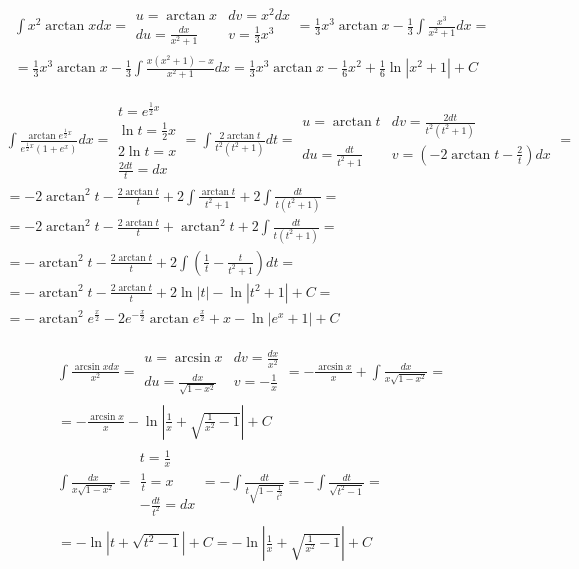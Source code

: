 
\begin{gather*}\int x^2\arctan x dx = \begin{array}{|ll|}
u=\arctan x & dv=x^2dx \\
du=\frac{dx}{x^2+1} & v=\frac{1}{3}x^3 \end{array} = \frac{1}{3}x^3\arctan x-\frac{1}{3}\int \frac{x^3}{x^2+1}dx =  \\
= \frac{1}{3}x^3\arctan x-\frac{1}{3}\int \frac{x(x^2+1)-x}{x^2+1}dx = \frac{1}{3}x^3\arctan x-\frac{1}{6}x^2+\frac{1}{6}\ln|x^2+1|+C\end{gather*}



\begin{gather*}\int \frac{\arctan e^{\frac{1}{2}x}}{e^{\frac{1}{2}x}(1+e^x)}dx = \begin{array}{|l|}
t=e^{\frac{1}{2}x} \\
\ln t = \frac{1}{2}x \\
2\ln t = x \\
\frac{2dt}{t} = dx \end{array} = \int \frac{2\arctan t}{t^2(t^2+1)}dt = \begin{array}{|ll|}
u=\arctan t & dv=\frac{2dt}{t^2(t^2+1)} \\
du=\frac{dt}{t^2+1} & v=\left(-2\arctan t-\frac{2}{t}\right)dx
\end{array} =  \\
= -2\arctan^2t-\frac{2\arctan t}{t}+2\int \frac{\arctan t}{t^2+1}+2\int \frac{dt}{t(t^2+1)} =  \\
= -2\arctan^2t-\frac{2\arctan t}{t}+\arctan^2 t+2\int \frac{dt}{t(t^2+1)} =  \\
= -\arctan^2t-\frac{2\arctan t}{t}+2\int \left(\frac{1}{t}-\frac{t}{t^2+1}\right)dt =  \\
= -\arctan^2t-\frac{2\arctan t}{t}+2\ln|t|-\ln|t^2+1|+C =  \\
= -\arctan^2e^{\frac{x}{2}}-2e^{-\frac{x}{2}}\arctan e^{\frac{x}{2}}+x-\ln|e^x+1|+C\end{gather*}



\begin{gather*}\int \frac{\arcsin x dx}{x^2} = \begin{array}{|ll|}
u=\arcsin x & dv=\frac{dx}{x^2} \\
du=\frac{dx}{\sqrt{1-x^2}} & v=-\frac{1}{x}
\end{array} = -\frac{\arcsin x}{x} + \int \frac{dx}{x\sqrt{1-x^2}} =  \\
= -\frac{\arcsin x}{x} -\ln\left|\frac{1}{x}+\sqrt{\frac{1}{x^2}-1}\right|+C \\
\int \frac{dx}{x\sqrt{1-x^2}} = \begin{array}{|l|}
t=\frac{1}{x} \\ \frac{1}{t}=x \\ -\frac{dt}{t^2}=dx
\end{array} = -\int \frac{dt}{t\sqrt{1-\frac{1}{t^2}}} = -\int \frac{dt}{\sqrt{t^2-1}} =  \\
= -\ln|t+\sqrt{t^2-1}|+C = -\ln\left|\frac{1}{x}+\sqrt{\frac{1}{x^2}-1}\right|+C\end{gather*}


